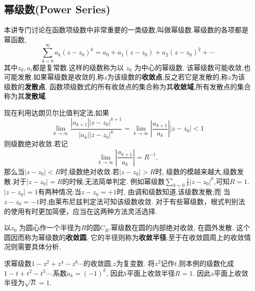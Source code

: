 \subsection{幂级数(Power Series)}
本讲专门讨论在函数项级数中非常重要的一类级数,叫做幂级数.幂级数的各项都是幂函数,
\begin{equation}
    \sum_{k=0}^{\infty} a_k\left(z-z_0\right)^k=a_0+a_1\left(z-z_0\right)+a_2\left(z-z_0\right)^2+\cdots
\end{equation}
其中$z_0, a_i$都是复常数.这样的级数称为以 $z_0$ 为中心的幂级数.
该幂级数可能收敛,也可能发散.如果幂级数是收敛的,称$z$为该级数的\textbf{收敛点};反之若它是发散的,称$z$为该级数的\textbf{发散点}.
函数项级数式的所有收敛点的集合称为其\textbf{收敛域},所有发散点的集合称为其\textbf{发散域}.

现在利用达朗贝尔比值判定法,如果
\begin{equation}
    \lim _{k \rightarrow \infty} \frac{\left|a_{k+1}\right|\left|z-z_0\right|^{k+1}}{\left|a_k\right|\left|z-z_0\right|^k}
    =\lim _{k \rightarrow \infty}\left|\frac{a_{k+1}}{a_k}\right|\left|z-z_0\right|<1
\end{equation}
则级数绝对收敛.若记
\begin{equation}
    \lim_{k \rightarrow \infty} \left|\frac{a_{k+1}}{a_k}\right| = R^{-1},
\end{equation}
那么当$|z-z_0| < R$时,级数绝对收敛.若$|z-z_0| > R$时, 级数的模越来越大,级数发散.对于$|z-z_0| = R$的时候,无法简单判定.
例如幂级数$\sum_{k=0} \frac{1}{k} |z-z_0|^k$,可知$R=1$.$|z-z_0|=1$有两种情况:当$z-z_0 = +1$时, 由调和级数知道,该级数发散;而
当$z-z_0 = -1$时,由莱布尼兹判定法可知该级数收敛.
对于有些幂级数，根式判别法的使用有时更加简便，应当在这两种方法灵活选择.

以$z_0$ 为圆心作一个半径为$R$的圆$C_R$.幂级数在圆的内部绝对收敛, 在圆外发散. 这个圆因而称为幂级数的\textbf{收敛圆}, 
它的半径则称为\textbf{收敛半径}.至于在收敛圆周上的收敛情况则需要具体分析.

\begin{examplebox}{求幂级数$1 - z^2 + z^4 - z^6\cdots$的收敛圆,$z$为复变数.}
    将$z^2$记作$t$,则本例的级数化成$1-t + t^2 - t^3\cdots$.系数$a_k =(-1)^k$, 因此t平面上收敛半径$R=1$. 
    因此$z$平面上收敛半径为$\sqrt{R}=1$.
\end{examplebox}

